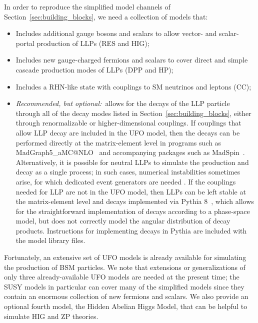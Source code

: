 In order to reproduce the simplified model channels of Section~\ref{sec:building_blocks}, we need a collection of models that:
%
\begin{itemize}
\item Includes additional gauge bosons and scalars to allow vector- and scalar-portal production of LLPs (RES and HIG);
\item Includes new gauge-charged fermions and scalars to cover direct and simple cascade production modes of LLPs (DPP and HP); 
\item Includes a RHN-like state with couplings to SM neutrinos and leptons (CC);
\item \emph{Recommended, but optional:}~allows for the decays of the LLP particle through all of the decay modes listed in Section~\ref{sec:building_blocks}, either through renormalizable or higher-dimensional couplings.
If couplings that allow LLP decay are included in the UFO model, then the decays can be performed directly at the matrix-element level in programs such as MadGraph5\_aMC@NLO~\cite{Alwall:2014hca} and accompanying packages such as MadSpin~\cite{Artoisenet:2012st}. Alternatively, it is possible for neutral LLPs to simulate the production and decay as a single process; in such cases, numerical instabilities sometimes arise, for which dedicated event generators are needed \cite{Nemevsek:2018bbt,}.
If the couplings needed for LLP are not in the UFO model, then LLPs can be left stable at the matrix-element level and decays implemented via Pythia 8~\cite{Sjostrand:2007gs,Sjostrand:2014zea}, which allows for the straightforward implementation of decays according to a phase-space model, but does not correctly model the angular distribution of decay products.
Instructions for implementing decays in Pythia are included with the model library files.
\end{itemize}

Fortunately, an extensive set of UFO models is already available for simulating the production of BSM particles.
We note that extensions or generalizations of only three already-available UFO models are needed at the present time; the SUSY models
in particular can cover many of the simplified models since they contain an enormous collection of new fermions and scalars.
We also provide an optional
fourth model, the Hidden Abelian Higgs Model, that can be helpful to simulate HIG and ZP theories.

